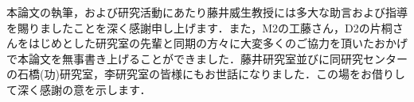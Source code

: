 \begin{acknowledgment}
    本論文の執筆，および研究活動にあたり藤井威生教授には多大な助言および指導を賜りましたことを深く感謝申し上げます．また，M2の工藤さん，D2の片桐さんをはじめとした研究室の先輩と同期の方々に大変多くのご協力を頂いたおかげで本論文を無事書き上げることができました．藤井研究室並びに同研究センターの石橋(功)研究室，李研究室の皆様にもお世話になりました．この場をお借りして深く感謝の意を示します．
\end{acknowledgment}
